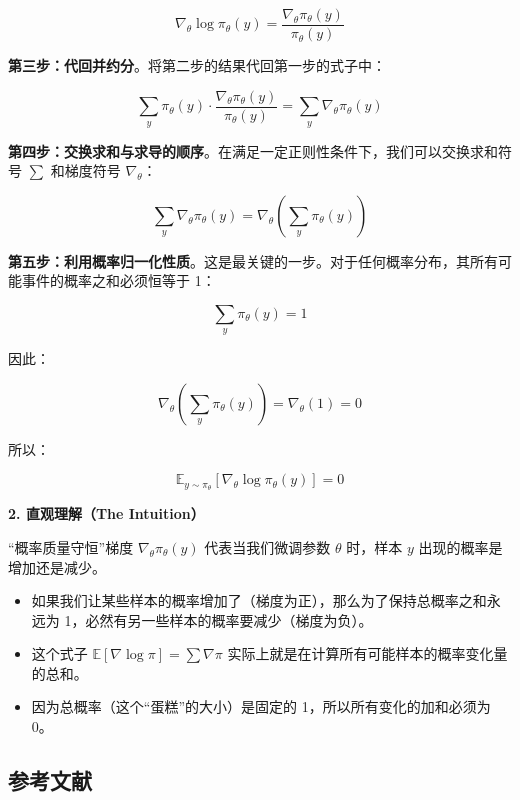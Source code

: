 \[
\nabla_\theta\log\pi_\theta(y)
=\frac{\nabla_\theta\pi_\theta(y)}{\pi_\theta(y)}
\]

\textbf{第三步：代回并约分}。将第二步的结果代回第一步的式子中：

\[
\sum_y \pi_\theta(y)\cdot
\frac{\nabla_\theta\pi_\theta(y)}{\pi_\theta(y)}
=\sum_y \nabla_\theta\pi_\theta(y)
\]

\textbf{第四步：交换求和与求导的顺序}。在满足一定正则性条件下，我们可以交换求和符号 \(\sum\) 和梯度符号 \(\nabla_\theta\)：

\[
\sum_y \nabla_\theta\pi_\theta(y)
=\nabla_\theta\left(\sum_y \pi_\theta(y)\right)
\]

\textbf{第五步：利用概率归一化性质}。这是最关键的一步。对于任何概率分布，其所有可能事件的概率之和必须恒等于 1：

\[
\sum_y \pi_\theta(y)=1
\]

因此：

\[
\nabla_\theta\left(\sum_y \pi_\theta(y)\right)
=\nabla_\theta(1)=0
\]

所以：

\[
\mathbb{E}_{y\sim\pi_\theta}\left[\nabla_\theta\log\pi_\theta(y)\right]=0
\]

\textbf{2. 直观理解（The Intuition）}

``概率质量守恒''梯度 \(\nabla_\theta\pi_\theta(y)\) 代表当我们微调参数 \(\theta\) 时，样本 \(y\) 出现的概率是增加还是减少。

\begin{itemize}
\tightlist
\item
  如果我们让某些样本的概率增加了（梯度为正），那么为了保持总概率之和永远为 1，必然有另一些样本的概率要减少（梯度为负）。
\item
  这个式子 \(\mathbb{E}[\nabla\log\pi]=\sum\nabla\pi\) 实际上就是在计算所有可能样本的概率变化量的总和。
\item
  因为总概率（这个``蛋糕''的大小）是固定的 1，所以所有变化的加和必须为 0。
\end{itemize}

\hypertarget{ux53c2ux8003ux6587ux732e-86}{%
\subsection{参考文献}\label{ux53c2ux8003ux6587ux732e-86}}

